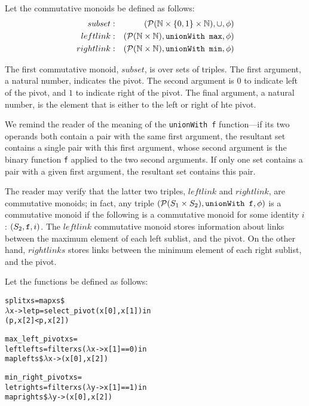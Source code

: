 Let the commutative monoids be defined as follows:
\begin{eqnarray*}
subset &:& \left(\mathcal{P}(\mathbb{N} \times \{0,1\} \times \mathbb{N}), \cup, \phi\right) \\
leftlink &:& \left(\mathcal{P}(\mathbb{N} \times \mathbb{N}), {\tt unionWith \,\,\,max}, \phi\right) \\
rightlink &:& \left(\mathcal{P}(\mathbb{N} \times \mathbb{N}), {\tt unionWith \,\,\,min}, \phi \right)
\end{eqnarray*}

The first commutative monoid, $subset$, is over sets of triples.  The first argument, a natural number, indicates the pivot.  The second argument is $0$ to indicate left of the pivot, and $1$ to indicate right of the pivot.  The final argument, a natural number, is the element that is either to the left or right of hte pivot.

We remind the reader of the meaning of the {\tt unionWith f} function---if its two operands both contain a pair with the same first argument, the resultant set contains a single pair with this first argument, whose second argument is the binary function {\tt f} applied to the two second arguments.  If only one set contains a pair with a given first argument, the resultant set contains this pair.

The reader may verify that the latter two triples, $leftlink$ and $rightlink$, are commutative monoids; in fact, any triple $\left(\mathcal{P}(S_1 \times S_2), {\tt unionWith \,\,\, f}, \phi\right)$ is a commutative monoid if the following is a commutative monoid for some identity $i$: $\left(S_2, {\tt f}, i\right)$.  The $leftlink$ commutative monoid stores information about links between the maximum element of each left sublist, and the pivot.  On the other hand, $rightlinks$ stores links between the minimum element of each right sublist, and the pivot.

Let the functions be defined as follows:
\begin{alltt}
split xs = map xs \$
    \(\lambda\)x -> let p = select_pivot(x[0], x[1]) in
        (p, x[2] < p, x[2])

max\_left\_pivot xs = 
    left lefts = filter xs (\(\lambda\)x -> x[1] == 0) in
        map lefts \$ \(\lambda\)x -> (x[0], x[2])

min\_right\_pivot xs = 
    let rights = filter xs (\(\lambda\)y -> x[1] == 1) in
        map rights \$ \(\lambda\)y -> (x[0], x[2])
\end{alltt}

